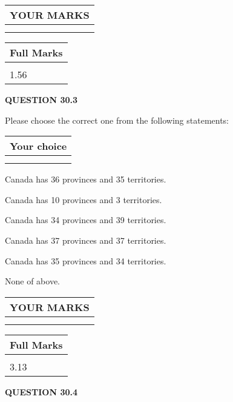 \documentclass[12pt]{article}
\begin{document}
  
 
  
\vspace{0.2in}
  
\noindent\begin{tabular}{|l|}
\hline
 YOUR MARKS  \\
\hline
 \\ 
 \\ 
\hline
\end{tabular}
\hspace{0.05in} \begin{tabular}{|l|}
\hline
 Full Marks  \\
\hline
 \\ 
1.56 \\
\hline
\end{tabular}
{\textbf{\Large{QUESTION
30.3 
}}}
  
  
Please choose the correct one from the following statements:
  
  
\noindent\hspace{3.0in} \begin{tabular}{|l|}
\hline
Your choice \\
\hline
 \\ 
 \\ 
\hline
\end{tabular}
  
  
 
 
Canada has  %
36 provinces and  %
35 territories.
 
 
Canada has  %
10 provinces and  %
3 territories.
 
 
Canada has  %
34 provinces and  %
39 territories.
 
 
Canada has  %
37 provinces and  %
37 territories.
 
 
Canada has  %
35 provinces and  %
34 territories.
 
 
 None of above.
 
 
  
\vspace{0.2in}
  
\noindent\begin{tabular}{|l|}
\hline
 YOUR MARKS  \\
\hline
 \\ 
 \\ 
\hline
\end{tabular}
\hspace{0.05in} \begin{tabular}{|l|}
\hline
 Full Marks  \\
\hline
 \\ 
3.13 \\
\hline
\end{tabular}
{\textbf{\Large{QUESTION
30.4 
}}}
  
\end{document}
